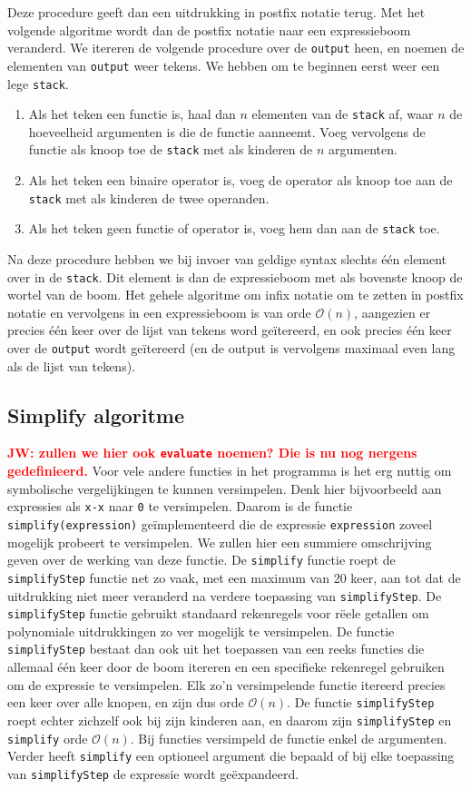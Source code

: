 \documentclass[a4paper]{article}
\newcommand{\rcom}[1]{\textbf{\textcolor{red}{#1}}}
\newcommand{\ttt}[1]{\texttt{#1}}
\begin{document}
Deze procedure geeft dan een uitdrukking in postfix notatie terug. Met het volgende algoritme wordt dan de postfix notatie naar een expressieboom veranderd. We itereren de volgende procedure over de \ttt{output} heen, en noemen de elementen van \ttt{output} weer tekens. We hebben om te beginnen eerst weer een lege \ttt{stack}.
\begin{enumerate}
\item Als het teken een functie is, haal dan $n$ elementen van de \ttt{stack} af, waar $n$ de hoeveelheid argumenten is die de functie aanneemt. Voeg vervolgens de functie als knoop toe de \ttt{stack} met als kinderen de $n$ argumenten. 
\item Als het teken een binaire operator is, voeg de operator als knoop toe aan de \ttt{stack} met als kinderen de twee operanden.
\item Als het teken geen functie of operator is, voeg hem dan aan de \ttt{stack} toe.
\end{enumerate}
Na deze procedure hebben we bij invoer van geldige syntax slechts \'e\'en element over in de \ttt{stack}. Dit element is dan de expressieboom met als bovenste knoop de wortel van de boom. Het gehele algoritme om infix notatie om te zetten in postfix notatie en vervolgens in een expressieboom is van orde $\mathcal{O}(n)$, aangezien er precies \'e\'en keer over de lijst van tekens word ge\"itereerd, en ook precies \'e\'en keer over de \ttt{output} wordt ge\"itereerd (en de output is vervolgens maximaal even lang als de lijst van tekens).

\subsection{Simplify algoritme}\rcom{JW: zullen we hier ook \ttt{evaluate} noemen? Die is nu nog nergens gedefinieerd.}
Voor vele andere functies in het programma is het erg nuttig om symbolische vergelijkingen te kunnen versimpelen. Denk hier bijvoorbeeld aan expressies als \ttt{x-x} naar \ttt{0} te versimpelen. Daarom is de functie \ttt{simplify(expression)} ge\"implementeerd die de expressie \ttt{expression} zoveel mogelijk probeert te versimpelen. We zullen hier een summiere omschrijving geven over de werking van deze functie. De \ttt{simplify} functie roept de \ttt{simplifyStep} functie net zo vaak, met een maximum van 20 keer, aan tot dat de uitdrukking niet meer veranderd na verdere toepassing van \ttt{simplifyStep}. De \ttt{simplifyStep} functie gebruikt standaard rekenregels voor r\"eele getallen om polynomiale uitdrukkingen zo ver mogelijk te versimpelen. De functie \ttt{simplifyStep} bestaat dan ook uit het toepassen van een reeks functies die allemaal \'e\'en keer door de boom itereren en een specifieke rekenregel gebruiken om de expressie te versimpelen. Elk zo'n versimpelende functie itereerd precies een keer over alle knopen, en zijn dus orde $\mathcal O(n)$. De functie \ttt{simplifyStep} roept echter zichzelf ook bij zijn kinderen aan, en daarom zijn \ttt{simplifyStep} en \ttt{simplify} orde $\mathcal O(n)$. Bij functies versimpeld de functie enkel de argumenten. Verder heeft \ttt{simplify} een optioneel argument die bepaald of bij elke toepassing van \ttt{simplifyStep} de expressie wordt ge\"expandeerd. 
\end{document}
